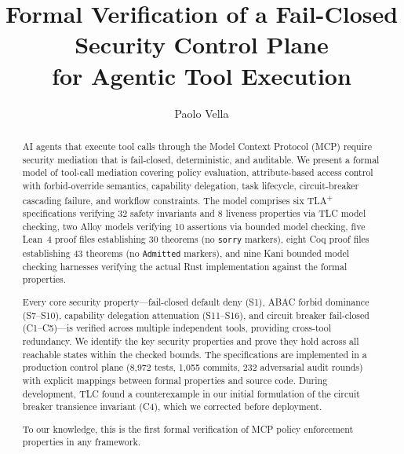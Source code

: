 \documentclass[sigplan,screen,nonacm]{acmart}
\newcommand{\tlaplus}{TLA\textsuperscript{+}\xspace}
\begin{document}
\title{Formal Verification of a Fail-Closed Security Control Plane\\for Agentic Tool Execution}

\author{Paolo Vella}

\begin{abstract}
AI agents that execute tool calls through the Model Context Protocol (MCP)
require security mediation that is fail-closed, deterministic, and auditable.
We present a formal model of tool-call mediation covering policy evaluation,
attribute-based access control with forbid-override semantics, capability
delegation, task lifecycle, circuit-breaker cascading failure, and workflow
constraints. The model comprises six \tlaplus specifications verifying 32
safety invariants and 8 liveness properties via TLC model checking, two Alloy
models verifying 10 assertions via bounded model checking, five Lean~4 proof
files establishing 30 theorems (no \texttt{sorry} markers), eight Coq proof
files establishing 43 theorems (no \texttt{Admitted} markers), and nine Kani
bounded model checking harnesses verifying the actual Rust implementation
against the formal properties.

Every core security property---fail-closed default deny (S1), ABAC
forbid dominance (S7--S10), capability delegation attenuation (S11--S16),
and circuit breaker fail-closed (C1--C5)---is verified across multiple
independent tools, providing cross-tool redundancy. We identify the key
security properties and prove they hold across all reachable states
within the checked bounds. The specifications are implemented in a production
control plane (8,972 tests, 1,055 commits, 232 adversarial audit rounds) with
explicit mappings between formal properties and source code. During
development, TLC found a counterexample in our initial formulation of the
circuit breaker transience invariant (C4), which we corrected before
deployment.

To our knowledge, this is the first formal verification of MCP policy
enforcement properties in any framework.
\end{abstract}


\maketitle
\end{document}
